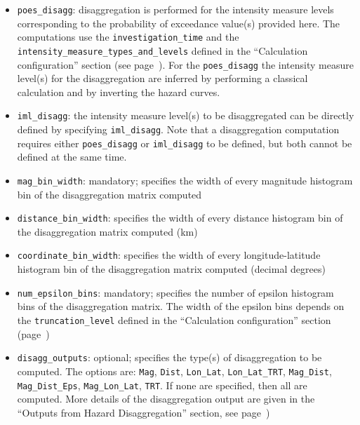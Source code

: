 \begin{itemize}

    \item \Verb+poes_disagg+: disaggregation is performed for the intensity
    measure levels corresponding to the probability of exceedance value(s) provided
    here. The computations use the \texttt{investigation\_time} and the
    \texttt{intensity\_measure\_types\_and\_levels} defined in the
    ``Calculation configuration'' section   (see page~\pageref{sec:calculation_configuration}).
    For the \texttt{poes\_disagg} the intensity measure level(s) for the disaggregation are
    inferred by performing a classical calculation and by inverting the hazard curves.

    \item \Verb+iml_disagg+: the intensity measure level(s) to be disaggregated
	    can be directly defined by specifying \texttt{iml\_disagg}. Note
		that a disaggregation computation requires either
		\texttt{poes\_disagg} or \texttt{iml\_disagg} to be defined, but
		both cannot be defined at the same time.

    \item \Verb+mag_bin_width+: mandatory; specifies the width of every
	    magnitude histogram bin of the disaggregation matrix computed

    \item \Verb+distance_bin_width+: specifies the width of every distance
	    histogram bin of the disaggregation matrix computed (km)

    \item \Verb+coordinate_bin_width+: specifies the width of every
	    longitude-latitude histogram bin of the disaggregation matrix
		computed (decimal degrees)

    \item \Verb+num_epsilon_bins+: mandatory; specifies the number of epsilon
	    histogram bins of the disaggregation matrix. The width of the
		epsilon bins depends on the \texttt{truncation\_level} defined
		in the ``Calculation configuration'' section
		(page~\pageref{sec:calculation_configuration})

    \item \Verb+disagg_outputs+: optional; specifies the type(s) of
	    disaggregation to be computed. The options are: \texttt{Mag},
		\texttt{Dist}, \texttt{Lon\_Lat}, \texttt{Lon\_Lat\_TRT},
		\texttt{Mag\_Dist}, \texttt{Mag\_Dist\_Eps},
		\texttt{Mag\_Lon\_Lat}, \texttt{TRT}. If none are specified,
		then all are computed. More details of the disaggregation output
		are given in the ``Outputs from Hazard Disaggregation'' section,
		see page~\pageref{subsec:output_hazard_disaggregation})


\end{itemize}
